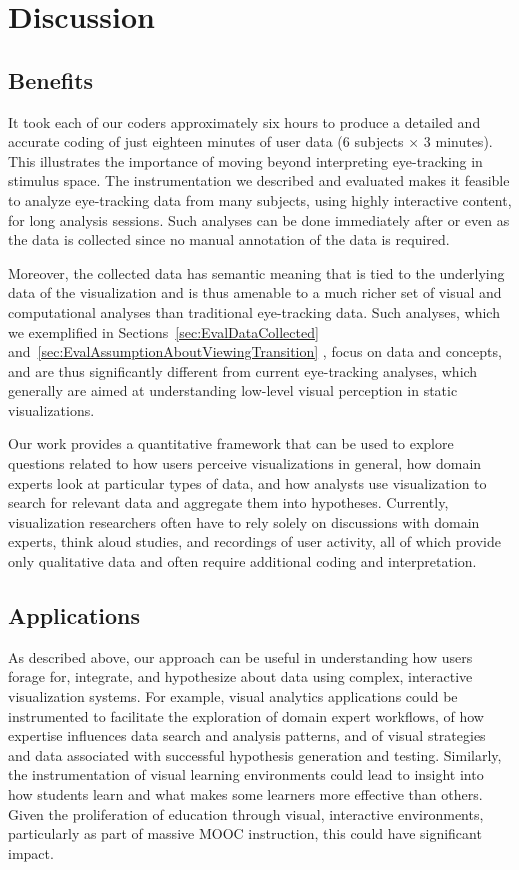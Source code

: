 ﻿\section{Discussion}
\label{sec:Discussion}
\subsection{Benefits}
\label{sec:Benefits}

It took each of our coders approximately six hours to produce a detailed and accurate coding of just eighteen minutes of user data ($6$ subjects $\times$ $3$ minutes). This illustrates the importance of moving beyond interpreting eye-tracking in stimulus space. The instrumentation we described and evaluated makes it feasible to analyze eye-tracking data from many subjects, using highly interactive content, for long analysis sessions. Such analyses can be done immediately after or even as the data is collected since no manual annotation of the data is required. 

Moreover, the collected data has semantic meaning that is tied to the underlying data of the visualization and is thus amenable to a much richer set of visual and computational analyses than traditional eye-tracking data. Such analyses, which we exemplified in Sections~\ref{sec:EvalDataCollected} and~\ref{sec:EvalAssumptionAboutViewingTransition} , focus on data and concepts, and are thus significantly different from current eye-tracking analyses, which generally are aimed at understanding low-level visual perception in static visualizations.

Our work provides a quantitative framework that can be used to explore questions related to how users perceive visualizations in general, how domain experts look at particular types of data, and how analysts use visualization to search for relevant data and aggregate them into hypotheses. Currently, visualization researchers often have to rely solely on discussions with domain experts, think aloud studies, and recordings of user activity, all of which provide only qualitative data and often require additional coding and interpretation.


\subsection{Applications}
\label{sec:Applications}
As described above, our approach can be useful in understanding how users forage for, integrate, and hypothesize about data using complex, interactive visualization systems. For example, visual analytics applications could be instrumented to facilitate the exploration of domain expert workflows, of how expertise influences data search and analysis patterns, and of visual strategies and data associated with successful hypothesis generation and testing. Similarly, the instrumentation of visual learning environments could lead to insight into how students learn and what makes some learners more effective than others. Given the proliferation of education through visual, interactive environments, particularly as part of massive MOOC instruction, this could have significant impact. 

